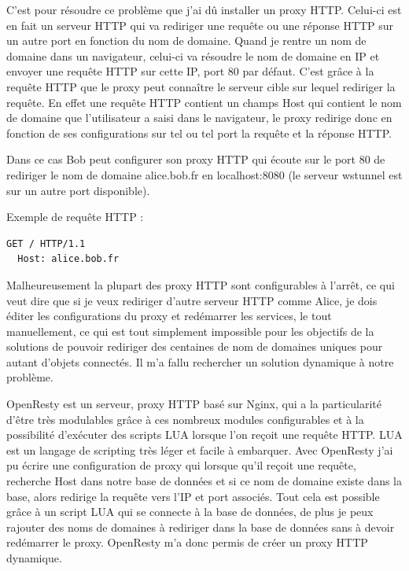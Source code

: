 C'est pour résoudre ce problème que j'ai dû installer un proxy HTTP. Celui-ci est en fait un serveur HTTP qui va rediriger une requête ou une réponse HTTP sur un autre port en fonction du nom de domaine. Quand je rentre un nom de domaine dans un navigateur, celui-ci va résoudre le nom de domaine en IP et envoyer une requête HTTP sur cette IP, port 80 par défaut. C'est grâce à la requête HTTP que le proxy peut connaître le serveur cible sur lequel rediriger la requête. En effet une requête HTTP contient un champs \og Host \fg{} qui contient le nom de domaine que l'utilisateur a saisi dans le navigateur, le proxy redirige donc en fonction de ses configurations sur tel ou tel port la requête et la réponse HTTP.

Dans ce cas Bob peut configurer son proxy HTTP qui écoute sur le port 80 de rediriger le nom de domaine \og alice.bob.fr \fg{} en \og localhost:8080 \fg{} (le serveur wstunnel est sur un autre port disponible).

Exemple de requête HTTP :
\begin{lstlisting}[language=bash]
  GET / HTTP/1.1
  Host: alice.bob.fr
\end{lstlisting}

Malheureusement la plupart des proxy HTTP sont configurables à l'arrêt, ce qui veut dire que si je veux rediriger d'autre serveur HTTP comme Alice, je dois éditer les configurations du proxy et redémarrer les services, le tout manuellement, ce qui est tout simplement impossible pour les objectifs de la solutions de pouvoir rediriger des centaines de nom de domaines uniques pour autant d'objets connectés. Il m'a fallu rechercher un solution dynamique à notre problème.

OpenResty est un serveur, proxy HTTP basé sur Nginx, qui a la particularité d'être très modulables grâce à ces nombreux modules configurables et à la possibilité d'exécuter des scripts LUA lorsque l'on reçoit une requête HTTP. LUA est un langage de scripting très léger et facile à embarquer. Avec OpenResty j'ai pu écrire une configuration de proxy qui lorsque qu'il reçoit une requête, recherche \og Host \fg{} dans notre base de données et si ce nom de domaine existe dans la base, alors redirige la requête vers l'IP et port associés. Tout cela est possible grâce à un script LUA qui se connecte à la base de données, de plus je peux rajouter des noms de domaines à rediriger dans la base de données sans à devoir redémarrer le proxy. OpenResty m'a donc permis de créer un proxy HTTP dynamique.

